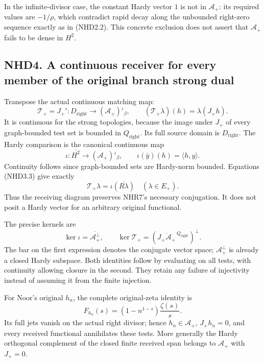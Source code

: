 In the infinite-divisor case, the constant Hardy vector \(1\) is not in
\(\mathscr A_+\): its required values are \(-1/\rho\), which contradict
rapid decay along the unbounded right-zero sequence exactly as in
(NHD2.2). This concrete exclusion does not assert that \(\mathscr A_+\)
fails to be dense in \(H^2\).

\subsection{NHD4. A continuous receiver for every member of the original
branch strong
dual}\label{nhd4.-a-continuous-receiver-for-every-member-of-the-original-branch-strong-dual}

Transpose the actual continuous matching map: \[
\mathcal T_+=J_+':D_{\mathrm{right}}\longrightarrow(\mathscr A_+)'_\beta,
\qquad (\mathcal T_+\lambda)(h)=\lambda(J_+h).
\tag{NHD4.1}
\] It is continuous for the strong topologies, because the image under
\(J_+\) of every graph-bounded test set is bounded in
\(Q_{\mathrm{right}}\). Its full source domain is
\(D_{\mathrm{right}}\). The Hardy comparison is the canonical continuous
map \[
\iota:\overline{H^2}\longrightarrow(\mathscr A_+)'_\beta,
\qquad\iota(\bar y)(h)=\langle h,y\rangle.
\tag{NHD4.2}
\] Continuity follows since graph-bounded sets are Hardy-norm bounded.
Equations (NHD3.3) give exactly \[
\mathcal T_+\lambda=\iota(\overline{R\lambda})\quad(\lambda\in E_+).
\tag{NHD4.3}
\] Thus the receiving diagram preserves NHR7's necessary conjugation. It
does not posit a Hardy vector for an arbitrary original functional.

The precise kernels are \[
\ker\iota=\overline{\mathscr A_+^\perp},
\qquad
\ker\mathcal T_+=(\overline{J_+\mathscr A_+}^{\,Q_{\mathrm{right}}})^\perp.
\tag{NHD4.4}
\] The bar on the first expression denotes the conjugate vector space;
\(\mathscr A_+^\perp\) is already a closed Hardy subspace. Both
identities follow by evaluating on all tests, with continuity allowing
closure in the second. They retain any failure of injectivity instead of
assuming it from the finite injection.

For Noor's original \(h_n\), the complete original-zeta identity is \[
F_{h_n}(s)=(1-n^{1-s})\frac{\zeta(s)}s.
\tag{NHD4.5}
\] Its full jets vanish on the actual right divisor; hence
\(h_n\in\mathscr A_+\), \(J_+h_n=0\), and every received functional
annihilates these tests. More generally the Hardy orthogonal complement
of the closed finite received span belongs to \(\mathscr A_+\) with
\(J_+=0\).

